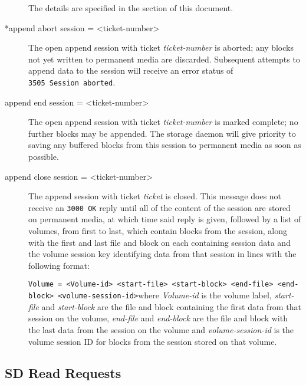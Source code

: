 \begin{description}
The details are specified in the
  section of this
document.

\item [*append abort session = {\textless}ticket-number{\textgreater}  ]
   The open append session with ticket {\it ticket-number} is aborted; any blocks
not yet written to permanent media are discarded. Subsequent attempts to
append data to the session will receive an error status of  {\tt 3505\
Session\ aborted}.

\item [append end session = {\textless}ticket-number{\textgreater}  ]
   \index{SPAN class }
   The open append session with ticket {\it ticket-number} is marked complete; no
further blocks may be appended. The storage daemon will give priority to
saving  any buffered blocks from this session to permanent media as soon as
possible.

\item [append close session = {\textless}ticket-number{\textgreater}  ]
   \index{SPAN class }
   The append session with ticket {\it ticket} is closed. This message  does not
receive an {\tt 3000\ OK} reply until all of the content of the  session are
stored on permanent media, at which time said reply is given,  followed by a
list of volumes, from first to last, which contain blocks from  the session,
along with the first and last file and block on each containing  session data
and the volume session key identifying data from that session in  lines with
the following format:

{\tt {\tt Volume = }{\textless}Volume-id{\textgreater} {\textless}start-file{\textgreater}
{\textless}start-block{\textgreater}  {\textless}end-file{\textgreater} {\textless}end-block{\textgreater}
{\textless}volume-session-id{\textgreater}}where {\it Volume-id} is the volume label,  {\it
start-file} and {\it start-block} are the file and block containing the  first
data from that session on the volume, {\it end-file} and  {\it end-block} are
the file and block with the last data from the session on  the volume and {\it
volume-session-id} is the volume session ID for blocks from the  session
stored on that volume.
\end{description}

\subsection{SD Read Requests}

